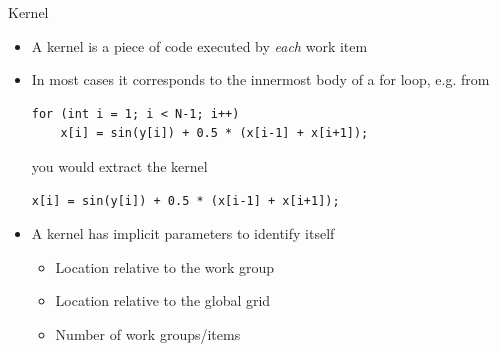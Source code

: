 \documentclass[18pt]{beamer}
\begin{document}
\begin{frame}[fragile]{Kernel}
  \begin{itemize}
    \item A kernel is a piece of code executed by \emph{each} work item
    \item In most cases it corresponds to the innermost body of a for loop, e.g.
      from
      \begin{lstlisting}
for (int i = 1; i < N-1; i++)
    x[i] = sin(y[i]) + 0.5 * (x[i-1] + x[i+1]);
      \end{lstlisting}
      you would extract the kernel
      \begin{lstlisting}
x[i] = sin(y[i]) + 0.5 * (x[i-1] + x[i+1]);
      \end{lstlisting}
    \item A kernel has implicit parameters to identify itself
      \begin{itemize}
        \item Location relative to the work group
        \item Location relative to the global grid
        \item Number of work groups/items
      \end{itemize}
  \end{itemize}
\end{frame}
\end{document}
